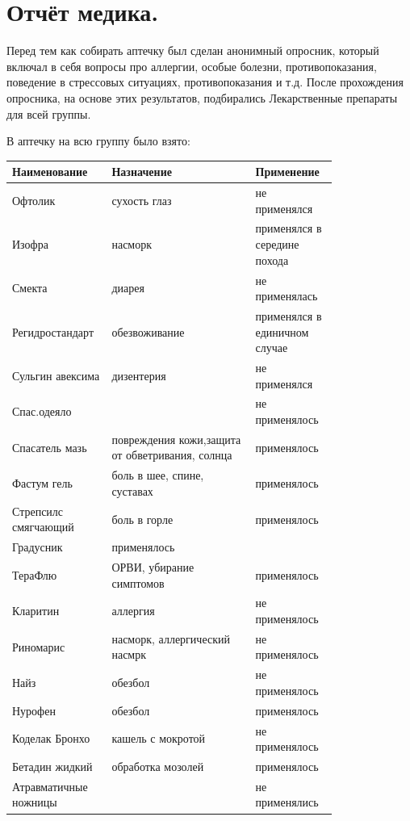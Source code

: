 \section{Отчёт медика.}

Перед тем как собирать аптечку был сделан анонимный опросник, который включал в себя вопросы про аллергии, особые болезни, противопоказания, поведение в стрессовых ситуациях, противопоказания и т.д.
После прохождения опросника, на основе этих результатов, подбирались Лекарственные препараты для всей группы.

В аптечку на всю группу было взято:

\begin{tabular}{|>{\centering\arraybackslash}m{0.2\linewidth}
		|>{\centering\arraybackslash}m{0.4\linewidth}
		|>{\centering\arraybackslash}m{0.2\linewidth}|}
	\hline
	\textbf{Наименование} & \textbf{Назначение} & \textbf{Применение} \\
	\hline
	Офтолик & сухость глаз & не применялся \\
	\hline
	Изофра & насморк & применялся в середине похода \\
	\hline
	Смекта & диарея & не применялась \\
	\hline
	Регидростандарт & обезвоживание & применялся в единичном случае \\
	\hline
	Сульгин авексима & дизентерия & не применялся \\
	\hline
	Спас.одеяло &  & не применялось \\
	\hline
	Спасатель мазь & повреждения кожи,\newline защита от обветривания, солнца & применялось \\
	\hline
	Фастум гель & боль в шее, спине, суставах & применялось \\
	\hline
	Стрепсилс смягчающий & боль в горле & применялось \\
	\hline
	Градусник & применялось &  \\
	\hline
	ТераФлю & ОРВИ, убирание симптомов & применялось \\
	\hline
	Кларитин & аллергия & не применялось \\
	\hline
	Риномарис & насморк, аллергический насмрк & не применялось \\
	\hline
	Найз & обезбол & не применялось \\
	\hline
	Нурофен & обезбол & применялось \\
	\hline
	Коделак Бронхо & кашель с мокротой & не применялось \\
	\hline
	Бетадин жидкий & обработка мозолей & применялось \\
	\hline
	Атравматичные ножницы &  & не применялись \\
	\hline
	

\end{tabular}

